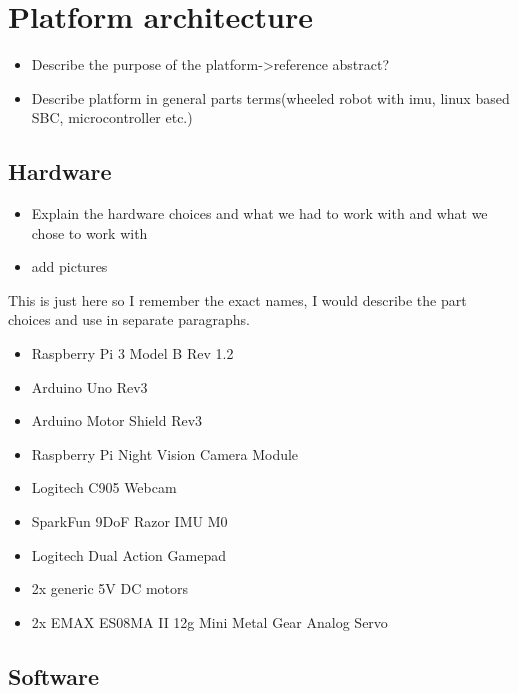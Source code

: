\chapter{Platform architecture}\label{cha:PlatformArchitecture}

\begin{itemize}
 \item Describe the purpose of the platform->reference abstract?
 \item Describe platform in general parts terms(wheeled robot with imu, linux based SBC, microcontroller etc.)
\end{itemize}

\section{Hardware}
\pagestyle{scrheadings}

\begin{itemize}
 \item Explain the hardware choices and what we had to work with and what we chose to work with
 \item add pictures
\end{itemize}

This is just here so I remember the exact names, I would describe the part choices and use in separate paragraphs.
\begin{itemize}
 \item Raspberry Pi 3 Model B Rev 1.2
 \item Arduino Uno Rev3
 \item Arduino Motor Shield Rev3
 \item Raspberry Pi Night Vision Camera Module
 \item Logitech C905 Webcam
 \item SparkFun 9DoF Razor IMU M0
 \item Logitech Dual Action Gamepad
 \item 2x generic 5V DC motors
 \item 2x EMAX ES08MA II 12g Mini Metal Gear Analog Servo
\end{itemize}

\section{Software}
\pagestyle{scrheadings}

